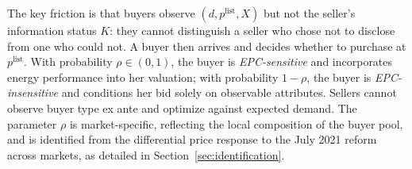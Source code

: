 \medskip
The key friction is that buyers observe $(d, p^{\text{list}}, X)$ but not the seller's information status $K$: they cannot distinguish a seller who chose not to disclose from one who could not. A buyer then arrives and decides whether to purchase at $p^{\text{list}}$. With probability $\rho\in(0,1)$, the buyer is \emph{EPC-sensitive} and incorporates energy performance into her valuation; with probability $1-\rho$, the buyer is \emph{EPC-insensitive} and conditions her bid solely on observable attributes. Sellers cannot observe buyer type ex ante and optimize against expected demand. The parameter $\rho$ is market-specific, reflecting the local composition of the buyer pool, and is identified from the differential price response to the July 2021 reform across markets, as detailed in Section~\ref{sec:identification}.
